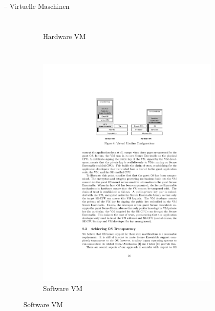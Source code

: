 \documentclass[fleqn,11pt,aspectratio=43,table]{beamer}
\newlength\foo
\begin{document}
\begin{frame}{\insertsectionhead -- Virtuelle Maschinen}
\begin{columns}
\begin{figure}
\begin{subfigure}[b]{\columnwidth}
				\caption*{\footnotesize Hardware VM\cite{boivie2013secureblue++:big}}
				\label{fig:hvm}
			\end{subfigure}
			\\
			\begin{subfigure}[b]{\columnwidth}
				\includegraphics[width=.8\columnwidth]{svm}
				\caption*{\footnotesize Software VM\cite{boivie2013secureblue++:big}}
				\label{fig:svm}
			\end{subfigure}
			\label{fig:vms}
		\end{figure}
	\end{columns}
\end{frame}
\end{document}
